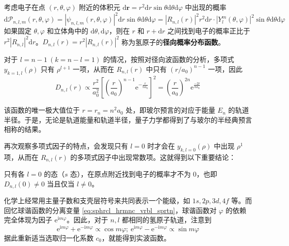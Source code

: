 \documentclass[cn,10pt,math=newtx,citestyle=gb7714-2015,bibstyle=gb7714-2015]{elegantbook}
\def\bm{\boldsymbol}
\def\d{\mathrm d}
\def\e{\mathrm e}
\def\i{\mathrm i}
\def\vphi{\varphi}
\def\P{\mathcal P}
\begin{document}
考虑电子在点 $(r,\theta,\vphi)$ 附近的体积元 $\d\bm r=r^2\d r\sin\theta\d\theta\d\vphi$ 中出现的概率
\begin{equation}
    \d\P_{n,l,m}(r,\theta,\vphi) = |\psi_{n,l,m}(r,\theta,\vphi)|^2\d r\sin\theta\d\theta\d\vphi = |R_{n,l}(r)|^2r^2\d r\cdot|Y_l^m(\theta,\vphi)|^2\sin\theta\d\theta\d\vphi
\end{equation}
如果固定 $\theta,\vphi$ 和立体角中的 $\d\theta,\d\vphi$，则在 $r$ 和 $r+\d r$ 之间找到电子的概率正比于 $r^2|R_{n,l}|^2\d r$。$D_{n,l}(r) = r^2|R_{n,l}(r)|^2$ 称为氢原子的\textbf{径向概率分布函数}。

对于 $l = n-1\ (k=n-l=1)$ 的情况，按照对径向波函数的分析，多项式 $y_{k=1,l}(\rho)$ 只有 $\rho^{l+1}$ 一项，从而在 $R_{n,l}(r)$ 中只有 $(r/a_0)^{n-1}$ 一项，因此
\begin{equation}
    D_{n,l}(r) \propto \frac{r^2}{a_0^2}\left[\left(\frac r{a_0}\right)^{n-1}\e^{-\frac{r}{na_0}}\right]^2 = \left(\frac r{a_0}\right)^{2n}\e^{\frac{-2r}{na_0}}
\end{equation}
\begin{remark}
该函数的唯一极大值位于 $r=r_n=n^2 a_0$ 处，即玻尔预言的对应于能量 $E_n$ 的轨道半径。于是，无论是轨道能量和轨道半径，量子力学都得到了与玻尔的半经典预言相称的结果。
\end{remark}

再次观察多项式因子的特点，会发现只有 $l=0$ 时才会在 $y_{k,l=0}(\rho)$ 中出现 $\rho^1$ 项，从而在 $R_{n,l}(r)$ 的多项式因子中出现常数项。这就得到以下重要结论：
\begin{corollary}[$s$ 轨道的特殊性]
只有各 $l=0$ 的态（$s$ 态），在原点附近找到电子的概率才不为 0，也即 $D_{n,l}(0)\ne 0$ 当且仅当 $l\ne 0$。
\end{corollary}

化学上经常用主量子数和支壳层符号来共同表示一个能级，如 $1s,2p,3d,4f$ 等。而回忆球谐函数的分离变量 \ref{eq:sphrcl_hrmnc_vrbl_sprtn}，球谐函数对 $\vphi$ 的依赖完全体现为因子 $\e^{\i m\vphi}$。因此，对于 $n,l$ 都相同的氢原子轨道，注意到
\begin{equation}
    \e^{\i m\vphi} + \e^{-\i m\vphi}\propto \cos m\vphi;\ \e^{\i m\vphi} - \e^{-\i m\vphi}\propto \sin m\vphi
\end{equation}
据此重新适当选取归一化系数 $c_0$，就能得到实波函数。
\end{document}
